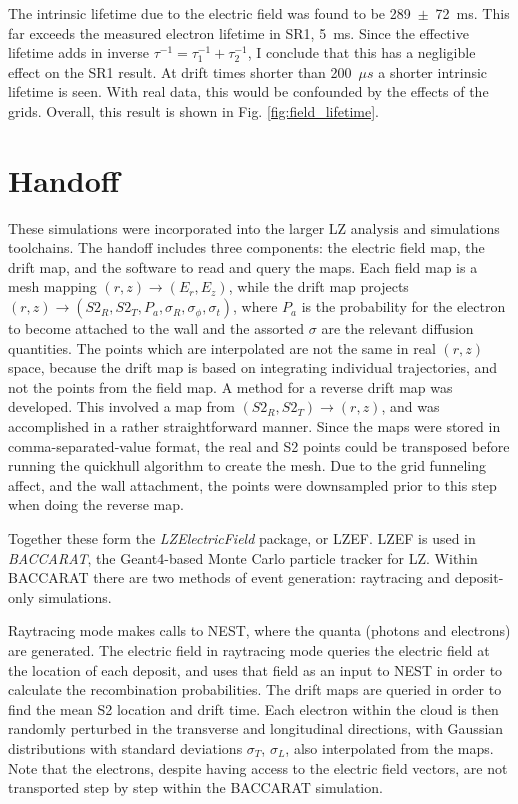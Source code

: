 The intrinsic lifetime due to the electric field was found to be 289~$\pm$~72~ms.
This far exceeds the measured electron lifetime in SR1, 5~ms.
Since the effective lifetime adds in inverse $\tau^{-1} = \tau_1^{-1} + \tau_2^{-1}$, I conclude that this has a negligible effect on the SR1 result.
At drift times shorter than 200~$\mu s$ a shorter intrinsic lifetime is seen.
With real data, this would be confounded by the effects of the grids.
Overall, this result is shown in Fig. \ref{fig:field_lifetime}.

\section{Handoff}

These simulations were incorporated into the larger LZ analysis and simulations toolchains.
The handoff includes three components: the electric field map, the drift map, and the software to read and query the maps.
Each field map is a mesh mapping $(r,z) \rightarrow (E_r, E_z)$, while the drift map projects $(r,z)\rightarrow(S2_R, S2_T, P_a, \sigma_R, \sigma_\phi, \sigma_t)$, where $P_a$ is the probability for the electron to become attached to the wall and the assorted $\sigma$ are the relevant diffusion quantities.
The points which are interpolated are not the same in real $(r,z)$ space, because the drift map is based on integrating individual trajectories, and not the points from the field map.
A method for a reverse drift map was developed.
This involved a map from $(S2_R,S2_T) \rightarrow(r,z)$, and was accomplished in a rather straightforward manner.
Since the maps were stored in comma-separated-value format, the real and S2 points could be transposed before running the quickhull algorithm to create the mesh.
Due to the grid funneling affect, and the wall attachment, the points were downsampled prior to this step when doing the reverse map.

Together these form the \textit{LZElectricField} package, or LZEF.
LZEF is used in \textit{BACCARAT}\cite{akerib_simulations_2021}, the Geant4\cite{agostinelli_geant4simulation_2003}-based Monte Carlo particle tracker for LZ.
Within BACCARAT there are two methods of event generation: raytracing and deposit-only simulations.

Raytracing mode makes calls to NEST\cite{szydagis_review_2021}, where the quanta (photons and electrons) are generated. 
The electric field in raytracing mode queries the electric field at the location of each deposit, and uses that field as an input to NEST in order to calculate the recombination probabilities.
The drift maps are queried in order to find the mean S2 location and drift time.
Each electron within the cloud is then randomly perturbed in the transverse and longitudinal directions, with Gaussian distributions with standard deviations $\sigma_T$, $\sigma_L$, also interpolated from the maps.
Note that the electrons, despite having access to the electric field vectors, are not transported step by step within the BACCARAT simulation.

